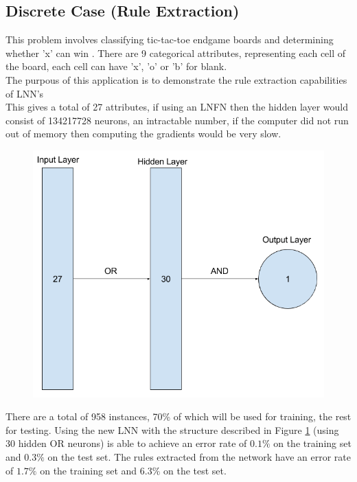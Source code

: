 \subsection{Discrete Case (Rule Extraction)}
This problem involves classifying tic-tac-toe endgame boards and determining whether 'x' can win \cite{Lichman:2013}. There are 9 categorical attributes, representing each cell of the board, each cell can have 'x', 'o' or 'b' for blank.\\

The purpous of this application is to demonstrate the rule extraction capabilities of LNN's\\

This gives a total of 27 attributes, if using an LNFN then the hidden layer would consist of 134217728 neurons, an intractable number, if the computer did not run out of memory then computing the gradients would be very slow.

\begin{figure}[H]
	\centering
	\begin{minipage}[b]{0.5\textwidth}
		\includegraphics[width=\textwidth]{Tic-Tac-Toe-Net.png}
		\caption{}
		\label{fig:tic-tac-toe-net}
	\end{minipage}
	\hfill
\end{figure}

There are a total of 958 instances, 70\% of which will be used for training, the rest for testing. Using the new LNN with the structure described in Figure \ref{fig:tic-tac-toe-net} (using 30 hidden OR neurons) is able to achieve an error rate of $0.1\%$ on the training set and $0.3\%$ on the test set. The rules extracted from the network have an error rate of $1.7\%$ on the training set and $6.3\%$ on the test set.\\

